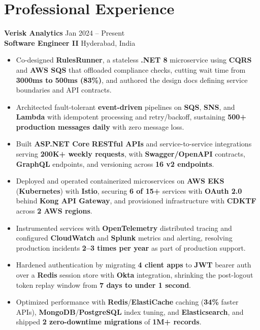 \documentclass[a4paper,10pt]{article}
\begin{document}
\section*{Professional Experience}

\textbf{Verisk Analytics} \hfill Jan 2024 -- Present \\
\textbf{Software Engineer II} \hfill Hyderabad, India

\begin{itemize}[leftmargin=*]
    \item Co-designed \textbf{RulesRunner}, a stateless \textbf{.NET 8} microservice using \textbf{CQRS} and \textbf{AWS SQS} that offloaded compliance checks, cutting wait time from \textbf{3000ms to 500ms (83\%)}, and authored the design docs defining service boundaries and API contracts.
    \item Architected fault-tolerant \textbf{event-driven} pipelines on \textbf{SQS}, \textbf{SNS}, and \textbf{Lambda} with idempotent processing and retry/backoff, sustaining \textbf{500+ production messages daily} with zero message loss.
    \item Built \textbf{ASP.NET Core} \textbf{RESTful APIs} and service-to-service integrations serving \textbf{200K+ weekly requests}, with \textbf{Swagger/OpenAPI} contracts, \textbf{GraphQL} endpoints, and versioning across \textbf{16 v2 endpoints}.
    \item Deployed and operated containerized microservices on \textbf{AWS EKS} (\textbf{Kubernetes}) with \textbf{Istio}, securing \textbf{6 of 15+} services with \textbf{OAuth 2.0} behind \textbf{Kong API Gateway}, and provisioned infrastructure with \textbf{CDKTF} across \textbf{2 AWS regions}.
    \item Instrumented services with \textbf{OpenTelemetry} distributed tracing and configured \textbf{CloudWatch} and \textbf{Splunk} metrics and alerting, resolving production incidents \textbf{2--3 times per year} as part of production support.
    \item Hardened authentication by migrating \textbf{4 client apps} to \textbf{JWT} bearer auth over a \textbf{Redis} session store with \textbf{Okta} integration, shrinking the post-logout token replay window from \textbf{7 days to under 1 second}.
    \item Optimized performance with \textbf{Redis}/\textbf{ElastiCache} caching (\textbf{34\%} faster APIs), \textbf{MongoDB}/\textbf{PostgreSQL} index tuning, and \textbf{Elasticsearch}, and shipped \textbf{2 zero-downtime migrations} of \textbf{1M+ records}.

\end{itemize}
\end{document}

